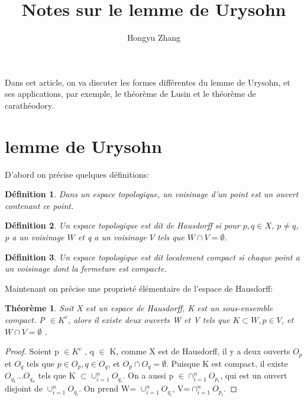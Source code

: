 \documentclass{article}
\title{Notes sur le lemme de Urysohn}
\author{Hongyu Zhang}
\newtheorem{theorem}{Théorème}[section]
\newtheorem{definition}{Définition}[section]
\begin{document}
\maketitle

Dans cet article, on va discuter les formes différentes du lemme de Urysohn, et ses applications, par exemple, le théorème de Lusin et le théorème de carathéodory.\par


\section{lemme de Urysohn}

D'abord on précise quelques définitions:
\begin{definition}
    Dans un espace topologique, un voisinage d'un point est un ouvert contenant ce point.
\end{definition}

\begin{definition}
     Un espace topologique est dit de Hausdorff si pour $p, q \in X$, $p \neq q$, p a un voisinage $W$ et q a un voisinage $V$ tels que $W \cap V = \emptyset$.
\end{definition}

\begin{definition}
    Un espace topologique est dit localement compact si chaque point a un voisinage dont la fermeture est compacte.
\end{definition}

Maintenant on précise une proprieté élémentaire de l'espace de Hausdorff:

\begin{theorem}
    Soit X est un espace de Hausdorff, K est un sous-ensemble compact. P $\in K^{c}$, alors il existe deux ouverts W et V tels que $K \subset W, p \in V$, et $W \cap V= \emptyset $ .  
\end{theorem}

\begin{proof}
    Soient p $\in K^{c}$ ,  q $\in$ K, comme X est de Hausdorff, il y a deux ouverts  $O_{p}$  et  $O_{q}$ tels que $p\in O{_p}, q\in O_{q}$, et $O_{p} \cap O_{q} = \emptyset$. Puisque K est compact, il existe $O_{q_1} \ldots O_{q_n}$ tels que K $\subset \cup_{i=1}^n O_{q_i}$. On a aussi p $\in \cap_{i=1}^n O_{p_i}$, qui est un ouvert disjoint de $\cup_{i=1}^n O_{q_i}$. On prend W= $\cup_{i=1}^n O_{q_i}$, V=$\cap_{i=1}^n O_{p_i}$.
\end{proof}
\end{document}
